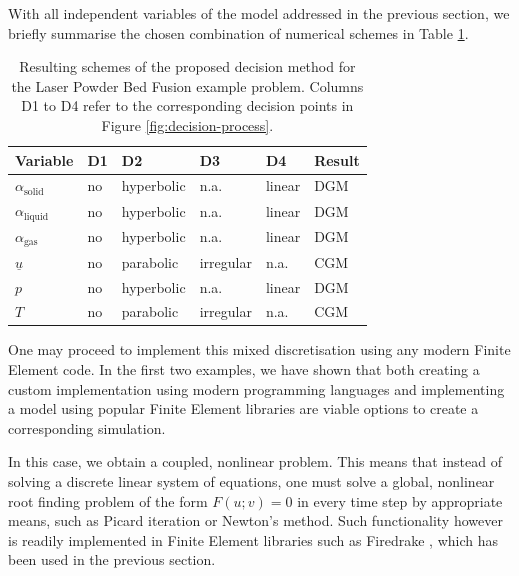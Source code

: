 \documentclass[sn-mathphys,Numbered]{sn-jnl}%
\theoremstyle{thmstyleone}%
\theoremstyle{thmstyletwo}%
\theoremstyle{thmstylethree}%
\begin{document}
With all independent variables of the model addressed in the previous section, we briefly summarise the chosen combination of numerical schemes in Table \ref{tab:lpbf-summary}.
\begin{table}[htbp!]
    \centering
    \caption{Resulting schemes of the proposed decision method for the Laser Powder Bed Fusion example problem. Columns D1 to D4 refer to the corresponding decision points in Figure \ref{fig:decision-process}.}
    \label{tab:lpbf-summary}
    \begin{tabular}{llllll} 
    \toprule
    \textbf{Variable} & \textbf{D1} & \textbf{D2} & \textbf{D3} & \textbf{D4} & \textbf{Result} \\ 
    \hline
    $\alpha_\text{solid}$ & no & hyperbolic & n.a. & linear & DGM \\
    $\alpha_\text{liquid}$ & no & hyperbolic & n.a. & linear & DGM \\
    $\alpha_\text{gas}$ & no & hyperbolic & n.a. & linear & DGM \\
    $\underline{u}$ & no & parabolic & irregular & n.a. & CGM \\
    $p$ & no & hyperbolic & n.a. & linear & DGM \\
    $T$ & no & parabolic & irregular & n.a. & CGM \\
    \bottomrule
    \end{tabular}
    \end{table}
One may proceed to implement this mixed discretisation using any modern Finite Element code.
In the first two examples, we have shown that both creating a custom implementation using modern programming languages and implementing a model using popular Finite Element libraries are viable options to create a corresponding simulation.

In this case, we obtain a coupled, nonlinear problem.
This means that instead of solving a discrete linear system of equations, one must solve a global, nonlinear root finding problem of the form $F(u;v) = 0$ in every time step by appropriate means, such as Picard iteration or Newton's method.
Such functionality however is readily implemented in Finite Element libraries such as Firedrake \cite{FiredrakeUserManual}, which has been used in the previous section.
\end{document}
